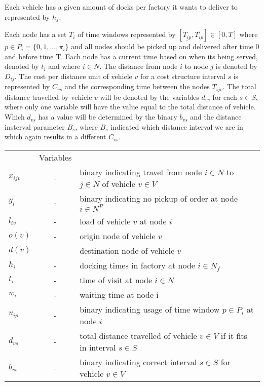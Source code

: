 \documentclass[a4paper,10pt]{article}
\begin{document}
Each vehicle has a given amount of docks per factory it wants to deliver to represented by $h_{f}$. \par 
Each node has a set $T_{i}$ of time windows represented by $[ \underline{T_{ip}},  \overline{T_{ip}} ] \in [0,T]$ where $p \in P_i=\{0,1,...,\pi_i\}$ and all nodes should be picked up and delivered after time 0 and before time T. 
Each node has a current time based on when its being served, denoted by $t_{i}$ and where $i \in N$. 
The distance from node $i$ to node $j$ is denoted by $D_{ij}$. 
The cost per distance unit of vehicle $v$ for a cost structure interval $s$ is represented by $C_{vs}$ and the corresponding time between the nodes $T_{ijv}$. 
The total distance travelled by vehicle $v$ will be denoted by the variables $d_{vs}$ for each $s\in S$, where only one variable will have the value equal to the total distance of vehicle. 
Which $d_{vs}$ has a value will be determined by the binary $b_{vs}$ and the distance insterval parameter $B_s$, where $B_s$ indicated which distance interval we are in which again results in a different $C_{vs}$. \par


\begin{tabular} {l c l}
    			&Variables										\\
	$x_{ijv}$	&-& 	binary indicating travel from node $i\in N$ to $j\in N$ of vehicle $v\in V$	\\
    	$y_i    $ 	&-& 	binary indicating no pickup of order at node $i\in N^P$				\\
	$l_{iv}	$	&-&	load of vehicle $v$ at node $i$							\\ 
    	$o(v)   $ 	&-& 	origin node of vehicle $v$							\\
	$d(v)	$	&-&	destination node of vehicle $v$							\\
	$h_i	$	&-&	docking times in factory at node $i\in N_f$					\\
	$t_i 	$	&-&	time of visit at node $i\in N$							\\
    	$w_i	$ 	&-& 	waiting time at node i								\\ 
	$u_{ip}	$	&-&	binary indicating usage of time window $p\in P_i$ at node $i$			\\
    	$d_{vs} $	&-& 	total distance travelled of vehicle $v\in V$ if it fits in interval $s\in S$	\\
	$b_{vs} $	&-&	binary indicating correct interval $s\in S$ for vehicle $v\in V$		\\
\end{tabular}
\end{document}
